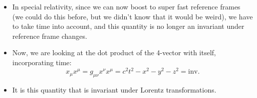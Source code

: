 \begin{itemize}
    \item In special relativity, since we can now boost to super fast reference frames (we could do this before, but we didn't know that it would be weird), we have to take time into account, and this quantity is no longer an invariant under reference frame changes.
    \item Now, we are looking at the dot product of the 4-vector with itself, incorporating time:
        \begin{equation}
            x_{\mu}x^{\mu} = g_{\mu\nu}x^{\nu}x^{\mu} = c^2t^2 - x^2 - y^2 - z^2 = \text{inv.}
        \end{equation}
    \item It is this quantity that is invariant under Lorentz transformations.
\end{itemize}



